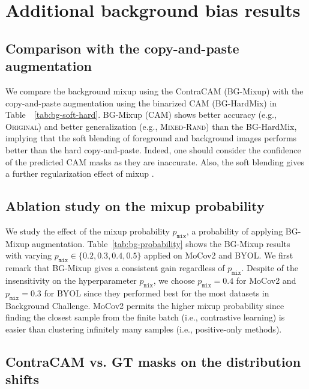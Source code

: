 \section{Additional background bias results}
\label{sec:add-bg}

\subsection{Comparison with the copy-and-paste augmentation}
\label{sec:add-bg-soft}

We compare the background mixup using the ContraCAM (BG-Mixup) with the copy-and-paste augmentation using the binarized CAM (BG-HardMix) in Table~~\ref{tab:bg-soft-hard}. BG-Mixup (CAM) shows better accuracy (e.g., \textsc{Original}) and better generalization (e.g., \textsc{Mixed-Rand}) than the BG-HardMix, implying that the soft blending of foreground and background images performs better than the hard copy-and-paste. Indeed, one should consider the confidence of the predicted CAM masks as they are inaccurate. Also, the soft blending gives a further regularization effect of mixup \citep{zhang2018mixup}.




\subsection{Ablation study on the mixup probability}
\label{sec:add-bg-augp}

We study the effect of the mixup probability $p_\texttt{mix}$, a probability of applying BG-Mixup augmentation. Table~\ref{tab:bg-probability} shows the BG-Mixup results with varying $p_\texttt{mix} \in  \{0.2,0.3,0.4,0.5\}$ applied on MoCov2 and BYOL. We first remark that BG-Mixup gives a consistent gain regardless of $p_\texttt{mix}$. Despite of the insensitivity on the hyperparameter $p_\texttt{mix}$, we choose $p_\texttt{mix} = 0.4$ for MoCov2 and $p_\texttt{mix} = 0.3$ for BYOL since they performed best for the most datasets in Background Challenge. MoCov2 permits the higher mixup probability since finding the closest sample from the finite batch (i.e., contrastive learning) is easier than clustering infinitely many samples (i.e., positive-only methods).




\newpage
\subsection{ContraCAM vs. GT masks on the distribution shifts}
\label{sec:add-bg-shift}


